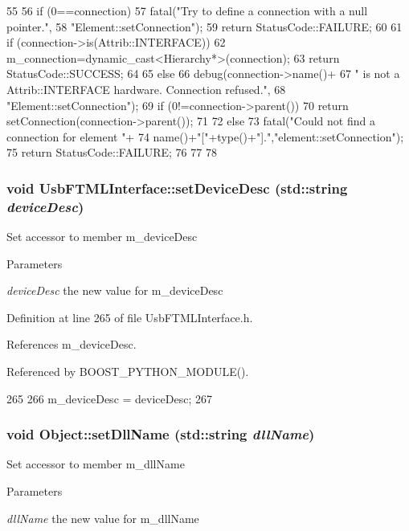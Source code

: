\begin{DoxyCode}
55                                                       {
56   if (0==connection){
57     fatal("Try to define a connection with a null pointer.",
58         "Element::setConnection");
59     return StatusCode::FAILURE;
60   }
61   if (connection->is(Attrib::INTERFACE)){
62     m_connection=dynamic_cast<Hierarchy*>(connection);
63     return StatusCode::SUCCESS;
64   }
65   else {
66     debug(connection->name()+
67         " is not a Attrib::INTERFACE hardware. Connection refused.",
68         "Element::setConnection");
69     if (0!=connection->parent()){
70       return setConnection(connection->parent());
71     }
72     else{
73       fatal("Could not find a connection for element "+
74           name()+"["+type()+"].","element::setConnection");
75       return StatusCode::FAILURE;
76     }
77   }
78 }
\end{DoxyCode}
\hypertarget{classUsbFTMLInterface_a8be842aa510ff8f915a9ad31f11154a0}{
\subsubsection[{setDeviceDesc}]{\setlength{\rightskip}{0pt plus 5cm}void UsbFTMLInterface::setDeviceDesc (std::string {\em deviceDesc})}}
\label{classUsbFTMLInterface_a8be842aa510ff8f915a9ad31f11154a0}
Set accessor to member m\_\-deviceDesc 
\begin{DoxyParams}{Parameters}
\item[{\em deviceDesc}]the new value for m\_\-deviceDesc \end{DoxyParams}


Definition at line 265 of file UsbFTMLInterface.h.

References m\_\-deviceDesc.

Referenced by BOOST\_\-PYTHON\_\-MODULE().


\begin{DoxyCode}
265                                             {
266     m_deviceDesc = deviceDesc;
267   }
\end{DoxyCode}
\hypertarget{classObject_a870c5af919958c2136623b2d7816d123}{
\subsubsection[{setDllName}]{\setlength{\rightskip}{0pt plus 5cm}void Object::setDllName (std::string {\em dllName})}}
\label{classObject_a870c5af919958c2136623b2d7816d123}
Set accessor to member m\_\-dllName 
\begin{DoxyParams}{Parameters}
\item[{\em dllName}]the new value for m\_\-dllName \end{DoxyParams}


